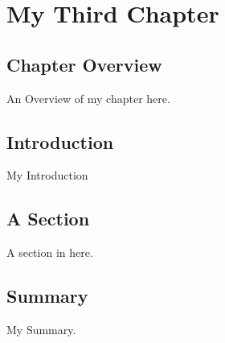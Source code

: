 \chapter{My Third Chapter}

\section{Chapter Overview}

An Overview of my chapter here.

\section{Introduction}

My Introduction

\section{A Section}

A section in here.

\section{Summary }

My Summary.